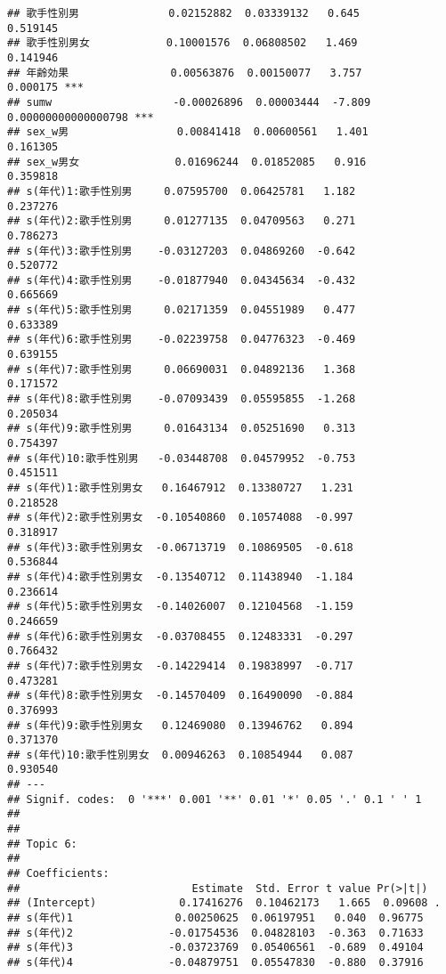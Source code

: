 \documentclass[
]{article}
\begin{document}
\begin{verbatim}
## 歌手性別男              0.02152882  0.03339132   0.645            0.519145    
## 歌手性別男女            0.10001576  0.06808502   1.469            0.141946    
## 年齢効果                0.00563876  0.00150077   3.757            0.000175 ***
## sumw                   -0.00026896  0.00003444  -7.809 0.00000000000000798 ***
## sex_w男                 0.00841418  0.00600561   1.401            0.161305    
## sex_w男女               0.01696244  0.01852085   0.916            0.359818    
## s(年代)1:歌手性別男     0.07595700  0.06425781   1.182            0.237276    
## s(年代)2:歌手性別男     0.01277135  0.04709563   0.271            0.786273    
## s(年代)3:歌手性別男    -0.03127203  0.04869260  -0.642            0.520772    
## s(年代)4:歌手性別男    -0.01877940  0.04345634  -0.432            0.665669    
## s(年代)5:歌手性別男     0.02171359  0.04551989   0.477            0.633389    
## s(年代)6:歌手性別男    -0.02239758  0.04776323  -0.469            0.639155    
## s(年代)7:歌手性別男     0.06690031  0.04892136   1.368            0.171572    
## s(年代)8:歌手性別男    -0.07093439  0.05595855  -1.268            0.205034    
## s(年代)9:歌手性別男     0.01643134  0.05251690   0.313            0.754397    
## s(年代)10:歌手性別男   -0.03448708  0.04579952  -0.753            0.451511    
## s(年代)1:歌手性別男女   0.16467912  0.13380727   1.231            0.218528    
## s(年代)2:歌手性別男女  -0.10540860  0.10574088  -0.997            0.318917    
## s(年代)3:歌手性別男女  -0.06713719  0.10869505  -0.618            0.536844    
## s(年代)4:歌手性別男女  -0.13540712  0.11438940  -1.184            0.236614    
## s(年代)5:歌手性別男女  -0.14026007  0.12104568  -1.159            0.246659    
## s(年代)6:歌手性別男女  -0.03708455  0.12483331  -0.297            0.766432    
## s(年代)7:歌手性別男女  -0.14229414  0.19838997  -0.717            0.473281    
## s(年代)8:歌手性別男女  -0.14570409  0.16490090  -0.884            0.376993    
## s(年代)9:歌手性別男女   0.12469080  0.13946762   0.894            0.371370    
## s(年代)10:歌手性別男女  0.00946263  0.10854944   0.087            0.930540    
## ---
## Signif. codes:  0 '***' 0.001 '**' 0.01 '*' 0.05 '.' 0.1 ' ' 1
## 
## 
## Topic 6:
## 
## Coefficients:
##                           Estimate  Std. Error t value Pr(>|t|)   
## (Intercept)             0.17416276  0.10462173   1.665  0.09608 . 
## s(年代)1                0.00250625  0.06197951   0.040  0.96775   
## s(年代)2               -0.01754536  0.04828103  -0.363  0.71633   
## s(年代)3               -0.03723769  0.05406561  -0.689  0.49104   
## s(年代)4               -0.04879751  0.05547830  -0.880  0.37916   

\end{verbatim}
\end{document}
